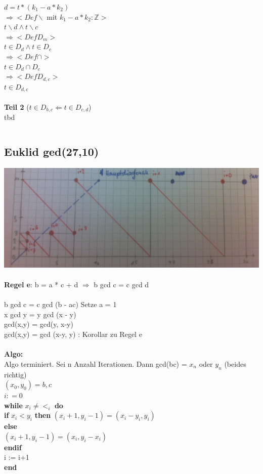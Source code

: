 \documentclass[a4paper,10pt]{article}
\newcommand{\ZN}{\mathbb{Z}} %
\newcommand{\Bold}[1]{\textbf{#1}} %
\newcommand{\Ra}{\Rightarrow}
\newcommand{\La}{\Leftarrow}
\begin{document}
\begin{description}
	$d = t*(k_1 - a*k_2)$ \\
	$\Ra <Def \backslash$ mit $k_1 - a*k_2 : \ZN >$ \\
	$t \backslash d \wedge t \backslash c$ \\
	$\Ra <Def D_m>$ \\
	$t \in D_d \wedge t\in D_c$ \\
	$\Ra <Def \cap>$ \\
	$t \in D_d \cap D_c$ \\
	$\Ra <Def D_{d,c}>$ \\
	$t \in D_{d,c}$ \\
	\\
	\Bold {Teil 2} ($t \in D_{b,c} \La t \in D_{c,d}$) \\
	tbd
\end{description}
\begin{tabular}{l l}
	
\end{tabular}
\subsection{Euklid ged(27,10)} 
\includegraphics[scale=0.4]{euklid.png} \\
\\
\Bold {Regel e}: b = a * c + d $\Ra$ b gcd c = c gcd d \\
\\
b gcd c = c gcd (b - ac) Setze a = 1 \\
x gcd y = y gcd (x - y) \\
gcd(x,y) = gcd(y, x-y) \\
gcd(x,y) = gcd (x-y, y) : Korollar zu Regel e \\
\\
\Bold {Algo:} \\
Algo terminiert. Sei n Anzahl Iterationen. Dann gcd(bc) = $x_n$ oder $y_n$ (beides richtig) \\
$(x_0, y_0) = b, c$ \\
$i : = 0 $ \\
\Bold {while} $x_i \neq <_i$ \Bold {do} \\
	\Bold {if}  $x_i<y_i$ \Bold {then}
	$(x_i+1,y_i-1) = (x_i - y_i, y_i)$ \\
	\Bold {else} \\
	$(x_i+1,y_i-1) = (x_i,  y_i - x_i)$ \\
	\Bold {endif} \\
	i := i+1 \\
\Bold {end}
\end{document}
